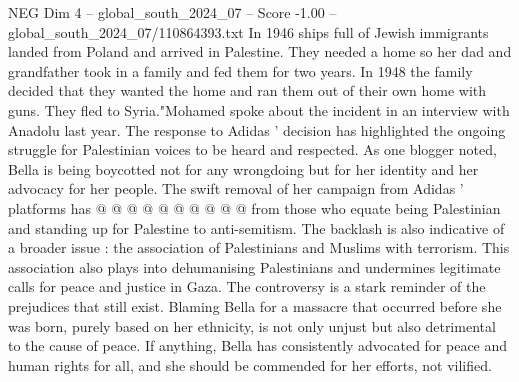 \begin{textsample}{NEG Dim 4 – global\_south\_2024\_07 – Score -1.00 – global\_south\_2024\_07/110864393.txt}
In 1946 ships full of Jewish immigrants landed from Poland and arrived in Palestine.
They needed a home so her dad and grandfather took in a family and fed them for two years.
In 1948 the family decided that they wanted the home and ran them out of their own home with guns.
They fled to Syria."Mohamed spoke about the incident in an interview with Anadolu last year.
The response to Adidas ' decision has highlighted the ongoing struggle for Palestinian voices to be heard and respected.
As one blogger noted, Bella is being boycotted not for any wrongdoing but for her identity and her advocacy for her people.
The swift removal of her campaign from Adidas ' platforms has @ @ @ @ @ @ @ @ @ @ from those who equate being Palestinian and standing up for Palestine to anti-semitism.
The backlash is also indicative of a broader issue : the association of Palestinians and Muslims with terrorism.
This association also plays into dehumanising Palestinians and undermines legitimate calls for peace and justice in Gaza.
The controversy is a stark reminder of the prejudices that still exist.
Blaming Bella for a massacre that occurred before she was born, purely based on her ethnicity, is not only unjust but also detrimental to the cause of peace.
If anything, Bella has consistently advocated for peace and human rights for all, and she should be commended for her efforts, not vilified.

\end{textsample}
